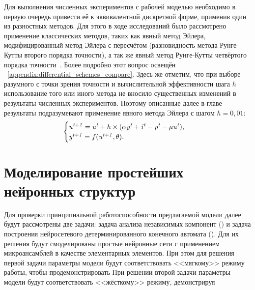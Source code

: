 Для выполнения численных экспериментов с рабочей моделью необходимо в первую очередь привести её к эквивалентной дискретной форме, применив один из разностных методов. Для этого в ходе исследований было рассмотрено применение классических методов, таких как явный метод Эйлера, модифицированный метод Эйлера с пересчётом (разновидность метода Рунге-Кутты второго порядка точности), а так же явный метод Рунге-Кутты четвёртого порядка точности~\cite{Hairer1990}. Более подробно этот вопрос освещён \inappendix~\ref{appendix:differential_schemes_compare}. Здесь же отметим, что при выборе разумного с точки зрения точности и вычислительной эффективности шага $h$ использование того или иного метода не вносило существенных изменений в результаты численных экспериментов. Поэтому описанные далее в главе результаты подразумевают применение явного метода Эйлера с шагом $h = 0,01$:
\begin{equation*}
    \begin{cases}
        \mathit{u^{t+1}} = \mathit{u^{t}} + h \times ( \alpha\mathit{y^{t}} + \mathit{i^{t}} - \mathit{p^{t}} - \mu\mathit{u^{t}} ), \\ 
        \mathit{y^{t+1}} = f(\mathit{u^{t+1}}, \theta).
    \end{cases}
\end{equation*}


\section{Моделирование простейших нейронных структур} \label{section:neuron_modeling}

Для проверки принципиальной работоспособности предлагаемой модели далее будут рассмотрены две задачи: задача анализа независимых компонент () и задача построения нейросетевого детерминированного конечного автомата (). Для их решения будут смоделированы простые нейронные сети с применением микроансамблей в качестве элементарных элементов. При этом для решения первой задачи параметры модели будут соответствовать <<мягкому>> режиму работы, чтобы продемонстрировать  При решении второй задачи параметры модели будут соответствовать <<жёсткому>> режиму, демонстрируя

